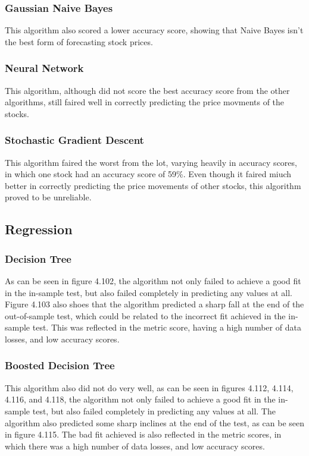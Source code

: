\subsubsection{Gaussian Naive Bayes}
This algorithm also scored a lower accuracy score, showing that Naive Bayes isn't the best form of forecasting stock prices.

\subsubsection{Neural Network}
This algorithm, although did not score the best accuracy score from the other algorithms, still faired well in correctly predicting the price movments of the stocks.

\subsubsection{Stochastic Gradient Descent}
This algorithm faired the worst from the lot, varying heavily in accuracy scores, in which one stock had an accuracy score of 59\%. Even though it faired miuch better in correctly predicting the price movements of other stocks, this algorithm proved to be unreliable.

\subsection{Regression}

\subsubsection{Decision Tree}
As can be seen in figure 4.102, the algorithm not only failed to achieve a good fit in the in-sample test, but also failed completely in predicting any values at all. Figure 4.103 also shoes that the algorithm predicted a sharp fall at the end of the out-of-sample test, which could be related to the incorrect fit achieved in the in-sample test. This was reflected in the metric score, having a high number of data losses, and low accuracy scores.

\subsubsection{Boosted Decision Tree}
This algorithm also did not do very well, as can be seen in figures 4.112, 4.114, 4.116, and 4.118, the algorithm not only failed to achieve a good fit in the in-sample test, but also failed completely in predicting any values at all. The algorithm also predicted some sharp inclines at the end of the test, as can be seen in figure 4.115. The bad fit achieved is also reflected in the metric scores, in which there was a high number of data losses, and low accuracy scores.

